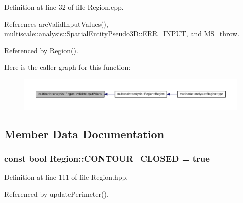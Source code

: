 \-Definition at line 32 of file \-Region.\-cpp.



\-References are\-Valid\-Input\-Values(), multiscale\-::analysis\-::\-Spatial\-Entity\-Pseudo3\-D\-::\-E\-R\-R\-\_\-\-I\-N\-P\-U\-T, and \-M\-S\-\_\-throw.



\-Referenced by \-Region().



\-Here is the caller graph for this function\-:\nopagebreak
\begin{figure}[H]
\begin{center}
\leavevmode
\includegraphics[width=350pt]{classmultiscale_1_1analysis_1_1Region_a517b46fd89696f44086aafb1a9526995_icgraph}
\end{center}
\end{figure}




\subsection{\-Member \-Data \-Documentation}
\hypertarget{classmultiscale_1_1analysis_1_1Region_a52c0c66ccfe38dc19379abaeba529f19}{
\subsubsection[{\-C\-O\-N\-T\-O\-U\-R\-\_\-\-C\-L\-O\-S\-E\-D}]{\setlength{\rightskip}{0pt plus 5cm}const bool {\bf \-Region\-::\-C\-O\-N\-T\-O\-U\-R\-\_\-\-C\-L\-O\-S\-E\-D} = true}}\label{classmultiscale_1_1analysis_1_1Region_a52c0c66ccfe38dc19379abaeba529f19}


\-Definition at line 111 of file \-Region.\-hpp.



\-Referenced by update\-Perimeter().


